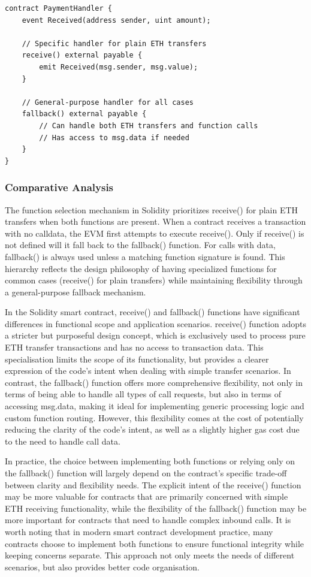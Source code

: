 \documentclass[conference]{IEEEtran}
\begin{document}
\begin{lstlisting}[style=solidity]
contract PaymentHandler {
    event Received(address sender, uint amount);
    
    // Specific handler for plain ETH transfers
    receive() external payable {
        emit Received(msg.sender, msg.value);
    }
    
    // General-purpose handler for all cases
    fallback() external payable {
        // Can handle both ETH transfers and function calls
        // Has access to msg.data if needed
    }
}
\end{lstlisting}

\subsubsection{Comparative Analysis}
The function selection mechanism in Solidity prioritizes receive() for plain ETH transfers when both functions are present. When a contract receives a transaction with no calldata, the EVM first attempts to execute receive(). Only if receive() is not defined will it fall back to the fallback() function. For calls with data, fallback() is always used unless a matching function signature is found. This hierarchy reflects the design philosophy of having specialized functions for common cases (receive() for plain transfers) while maintaining flexibility through a general-purpose fallback mechanism.

In the Solidity smart contract, receive() and fallback() functions have significant differences in functional scope and application scenarios. receive() function adopts a stricter but purposeful design concept, which is exclusively used to process pure ETH transfer transactions and has no access to transaction data. This specialisation limits the scope of its functionality, but provides a clearer expression of the code's intent when dealing with simple transfer scenarios. In contrast, the fallback() function offers more comprehensive flexibility, not only in terms of being able to handle all types of call requests, but also in terms of accessing msg.data, making it ideal for implementing generic processing logic and custom function routing. However, this flexibility comes at the cost of potentially reducing the clarity of the code's intent, as well as a slightly higher gas cost due to the need to handle call data.

In practice, the choice between implementing both functions or relying only on the fallback() function will largely depend on the contract's specific trade-off between clarity and flexibility needs. The explicit intent of the receive() function may be more valuable for contracts that are primarily concerned with simple ETH receiving functionality, while the flexibility of the fallback() function may be more important for contracts that need to handle complex inbound calls. It is worth noting that in modern smart contract development practice, many contracts choose to implement both functions to ensure functional integrity while keeping concerns separate. This approach not only meets the needs of different scenarios, but also provides better code organisation.
\vspace{3em}  %
\end{document}
